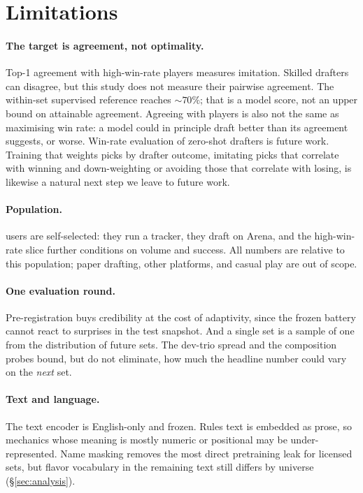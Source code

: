 \section{Limitations}
\label{sec:limitations}

\paragraph{The target is agreement, not optimality.}
Top-1 agreement with high-win-rate players measures imitation. Skilled
drafters can disagree, but this study does not measure their pairwise
agreement. The within-set supervised reference reaches ${\sim}70\%$; that
is a model score, not an upper bound on attainable agreement. Agreeing with
players is also not the same as maximising win rate: a model could in
principle draft better than its agreement suggests, or worse. Win-rate
evaluation of zero-shot drafters is future work. Training
that weights picks by drafter outcome, imitating picks that correlate
with winning and down-weighting or avoiding those that correlate with
losing, is likewise a natural next step we leave to future work.

\paragraph{Population.}
\seventeenlands{} users are self-selected: they run a tracker, they draft
on Arena, and the high-win-rate slice further conditions on volume and
success. All numbers are relative to this population; paper drafting,
other platforms, and casual play are out of scope.

\paragraph{One evaluation round.}
Pre-registration buys credibility at the cost of adaptivity, since the
frozen battery cannot react to surprises in the test snapshot. And a
single set is a sample of one from the distribution of future sets. The
dev-trio spread and the composition probes bound, but do not eliminate,
how much the headline number could vary on the \emph{next} set.

\paragraph{Text and language.}
The text encoder is English-only and frozen. Rules text is embedded as
prose, so mechanics whose meaning is mostly numeric or positional may be
under-represented. Name masking removes the most direct pretraining
leak for licensed sets, but flavor vocabulary in the remaining text still
differs by universe (\S\ref{sec:analysis}).

